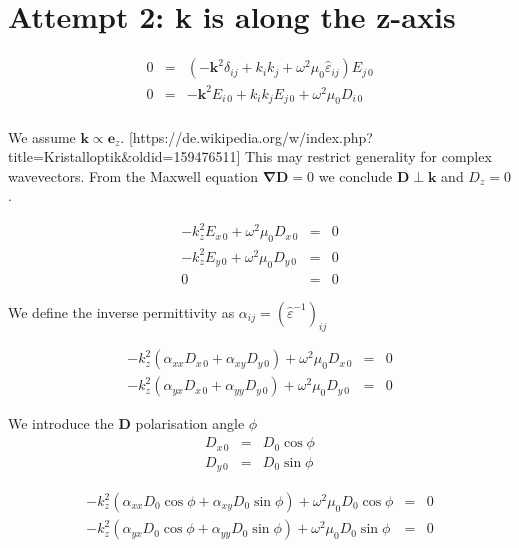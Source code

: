 \documentclass[12pt,a4paper,twoside,openright,BCOR10mm,headsepline,titlepage,abstracton,chapterprefix,final]{scrreprt}
\newcommand\Vector[1]{{\mathbf{#1}}}
\newcommand\wavenumber{k}
\newcommand\Wavevector{\Vector{\wavenumber}}
\newcommand\Nabla{\Vector{\nabla}}
\newcommand\Tensor[1]{\hat{#1}}
\newcommand\scalarDfield{D}
\newcommand\Dfield{\Vector{\scalarDfield}}
\newcommand\permittivity{\Tensor{\scalarpermittivity}}
\newcommand\scalarpermittivity{\varepsilon}
\begin{document}
\section{Attempt 2: k is along the z-axis}

\begin{eqnarray}
 0 &=& \left(-\Vector{k}^2 \delta_{ij} + k_i k_j + \omega^2 \mu_0 \permittivity_{ij} \right) E_{j\,0} \\
 0 &=& -\Vector{k}^2 E_{i\,0} + k_i k_j E_{j\,0} + \omega^2 \mu_0 D_{i\,0} \\
\end{eqnarray}

We assume $\Wavevector \propto \Vector{e}_z$. [https://de.wikipedia.org/w/index.php?title=Kristalloptik\&oldid=159476511]
This may restrict generality for complex wavevectors.
From the Maxwell equation $\Nabla \Dfield = 0$ we conclude $\Dfield \perp \Wavevector$ and $\scalarDfield_z=0$.

\begin{eqnarray}
 - \wavenumber_z^2 E_{x\,0} + \omega^2 \mu_0 \scalarDfield_{x\,0} &=& 0\\ 
 - \wavenumber_z^2 E_{y\,0} + \omega^2 \mu_0 \scalarDfield_{y\,0} &=& 0\\
 0 &=& 0
\end{eqnarray}

We define the inverse permittivity as $\alpha_{ij} = (\permittivity^{-1})_{ij}$

\begin{eqnarray}
 - \wavenumber_z^2 (\alpha_{xx} \scalarDfield_{x\,0} + \alpha_{xy} \scalarDfield_{y\,0}) + \omega^2 \mu_0 \scalarDfield_{x\,0} &=& 0\\ 
 - \wavenumber_z^2 (\alpha_{yx} \scalarDfield_{x\,0} + \alpha_{yy} \scalarDfield_{y\,0}) + \omega^2 \mu_0 \scalarDfield_{y\,0} &=& 0
\end{eqnarray}

We introduce the $\Dfield$ polarisation angle $\phi$
\begin{eqnarray}
 \scalarDfield_{x\,0} &=& \scalarDfield_{0} \cos \phi \\
 \scalarDfield_{y\,0} &=& \scalarDfield_{0} \sin \phi
\end{eqnarray}

\begin{eqnarray}
 - \wavenumber_z^2 (\alpha_{xx} \scalarDfield_{0} \cos \phi + \alpha_{xy} \scalarDfield_{0} \sin \phi) + \omega^2 \mu_0 \scalarDfield_{0} \cos \phi &=& 0\\ 
 - \wavenumber_z^2 (\alpha_{yx} \scalarDfield_{0} \cos \phi + \alpha_{yy} \scalarDfield_{0} \sin \phi) + \omega^2 \mu_0 \scalarDfield_{0} \sin \phi &=& 0
\end{eqnarray}
\end{document}
